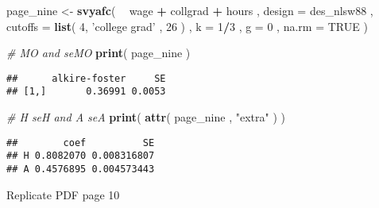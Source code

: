 \documentclass[]{book}
\newenvironment{Shaded}{\begin{snugshade}}{\end{snugshade}}
\newcommand{\CommentTok}[1]{\textcolor[rgb]{0.56,0.35,0.01}{\textit{#1}}}
\newcommand{\DataTypeTok}[1]{\textcolor[rgb]{0.13,0.29,0.53}{#1}}
\newcommand{\DecValTok}[1]{\textcolor[rgb]{0.00,0.00,0.81}{#1}}
\newcommand{\KeywordTok}[1]{\textcolor[rgb]{0.13,0.29,0.53}{\textbf{#1}}}
\newcommand{\NormalTok}[1]{#1}
\newcommand{\OperatorTok}[1]{\textcolor[rgb]{0.81,0.36,0.00}{\textbf{#1}}}
\newcommand{\OtherTok}[1]{\textcolor[rgb]{0.56,0.35,0.01}{#1}}
\newcommand{\StringTok}[1]{\textcolor[rgb]{0.31,0.60,0.02}{#1}}
\begin{document}
\begin{Shaded}
\begin{Highlighting}[]
\NormalTok{page_nine <-}
\StringTok{  }\KeywordTok{svyafc}\NormalTok{(}
    \OperatorTok{~}\StringTok{ }\NormalTok{wage }\OperatorTok{+}\StringTok{ }\NormalTok{collgrad }\OperatorTok{+}\StringTok{ }\NormalTok{hours , }
    \DataTypeTok{design =}\NormalTok{ des_nlsw88 , }
    \DataTypeTok{cutoffs =} \KeywordTok{list}\NormalTok{( }\DecValTok{4}\NormalTok{, }\StringTok{'college grad'}\NormalTok{ , }\DecValTok{26}\NormalTok{ ) , }
    \DataTypeTok{k =} \DecValTok{1}\OperatorTok{/}\DecValTok{3}\NormalTok{ , }\DataTypeTok{g =} \DecValTok{0}\NormalTok{ , }
    \DataTypeTok{na.rm =} \OtherTok{TRUE}
\NormalTok{  )}

\CommentTok{# MO and seMO}
\KeywordTok{print}\NormalTok{( page_nine )}
\end{Highlighting}
\end{Shaded}

\begin{verbatim}
##      alkire-foster     SE
## [1,]       0.36991 0.0053
\end{verbatim}

\begin{Shaded}
\begin{Highlighting}[]
\CommentTok{# H seH and A seA}
\KeywordTok{print}\NormalTok{( }\KeywordTok{attr}\NormalTok{( page_nine , }\StringTok{"extra"}\NormalTok{ ) )}
\end{Highlighting}
\end{Shaded}

\begin{verbatim}
##        coef          SE
## H 0.8082070 0.008316807
## A 0.4576895 0.004573443
\end{verbatim}

Replicate PDF page 10
\end{document}
